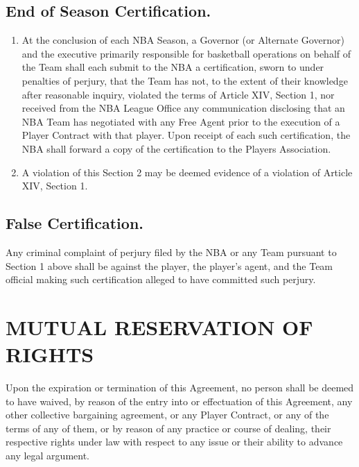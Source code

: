 \documentclass[
]{book}
\providecommand{\tightlist}{%
  \setlength{\itemsep}{0pt}\setlength{\parskip}{0pt}}
\begin{document}
\hypertarget{end-of-season-certification.}{%
\section{End of Season Certification.}\label{end-of-season-certification.}}

\begin{enumerate}
\def\labelenumi{(\alph{enumi})}
\tightlist
\item
  At the conclusion of each NBA Season, a Governor (or Alternate Governor) and the executive primarily responsible for basketball operations on behalf of the Team shall each submit to the NBA a certification, sworn to under penalties of perjury, that the Team has not, to the extent of their knowledge after reasonable inquiry, violated the terms of Article XIV, Section 1, nor received from the NBA League Office any communication disclosing that an NBA Team has negotiated with any Free Agent prior to the execution of a Player Contract with that player. Upon receipt of each such certification, the NBA shall forward a copy of the certification to the Players Association.
\item
  A violation of this Section 2 may be deemed evidence of a violation of Article XIV, Section 1.
\end{enumerate}

\hypertarget{false-certification.}{%
\section{False Certification.}\label{false-certification.}}

Any criminal complaint of perjury filed by the NBA or any Team pursuant to Section 1 above shall be against the player, the player's agent, and the Team official making such certification alleged to have committed such perjury.

\hypertarget{mutual-reservation-of-rights}{%
\chapter{MUTUAL RESERVATION OF RIGHTS}\label{mutual-reservation-of-rights}}

Upon the expiration or termination of this Agreement, no person shall be deemed to have waived, by reason of the entry into or effectuation of this Agreement, any other collective bargaining agreement, or any Player Contract, or any of the terms of any of them, or by reason of any practice or course of dealing, their respective rights under law with respect to any issue or their ability to advance any legal argument.
\end{document}
